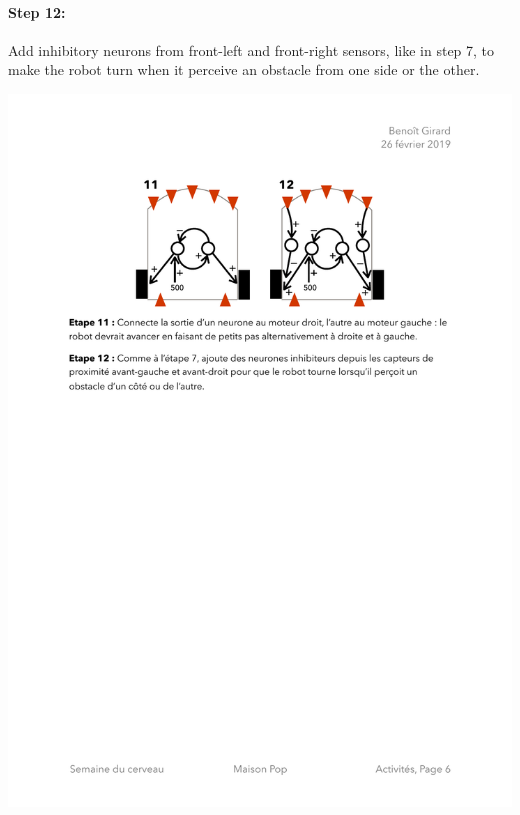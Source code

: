 \documentclass[12pt]{article}
\begin{document}
\paragraph{Step 12:} 

Add inhibitory neurons from front-left and front-right sensors, like in step 7, to make the robot turn when it perceive an obstacle from one side or the other.

\includegraphics{../Etapes11-12.pdf}
\end{document}
